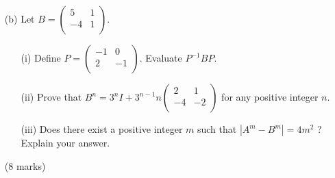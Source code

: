 \documentclass[12pt]{article}
\begin{document}
\begin{enumerate}
\begin{enumerate}
		\item [(b)]Let $B = \begin{pmatrix}
			5 & 1\\
			-4 & 1\\
			\end{pmatrix}$. 
		\begin{enumerate}
			\item [(i)]Define $P = \begin{pmatrix}
			-1 & 0\\
			2 & -1\\
			\end{pmatrix}$. Evaluate $P^{-1}BP$.  
			\item [(ii)]Prove that $B^n = 3^nI + 3^{n-1}n\begin{pmatrix}
			2&1\\-4&-2\\
			\end{pmatrix}$ for any positive integer $n$.
			\item [(iii)]Does there exist a positive integer $m$ such that $|A^m - B^m| = 4m^2$ ? Explain your answer.
		\end{enumerate}
		(8 marks)
	\end{enumerate}	
\end{enumerate}
\end{document}
